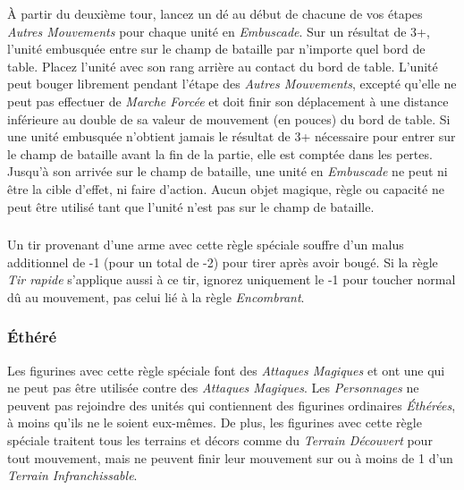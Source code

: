  À partir du deuxième tour, lancez un dé au début de chacune de vos étapes \emph{Autres Mouvements} pour chaque unité en \emph{Embuscade}. Sur un résultat de 3+, l'unité embusquée entre sur le champ de bataille par n'importe quel bord de table. Placez l'unité avec son rang arrière au contact du bord de table. L'unité peut bouger librement pendant l'étape des \emph{Autres Mouvements}, excepté qu'elle ne peut pas effectuer de \emph{Marche Forcée} et doit finir son déplacement à une distance inférieure au double de sa valeur de mouvement (en pouces) du bord de table. Si une unité embusquée n'obtient jamais le résultat de 3+ nécessaire pour entrer sur le champ de bataille avant la fin de la partie, elle est comptée dans les pertes.  Jusqu'à son arrivée sur le champ de bataille, une unité en \emph{Embuscade} ne peut ni être la cible d'effet, ni faire d'action. Aucun objet magique, règle ou capacité ne peut être utilisé tant que l'unité n'est pas sur le champ de bataille.

\subsubsection*{}

Un tir provenant d'une arme avec cette règle spéciale souffre d'un malus additionnel de -1 (pour un total de -2) pour tirer après avoir bougé. Si la règle \emph{Tir rapide} s'applique aussi à ce tir, ignorez uniquement le -1 pour toucher normal dû au mouvement, pas celui lié à la règle \emph{Encombrant}.

\subsubsection*{Éthéré}

Les figurines avec cette règle spéciale font des \emph{Attaques Magiques} et ont une  qui ne peut pas être utilisée contre des \emph{Attaques Magiques}. Les \emph{Personnages} ne peuvent pas rejoindre des unités qui contiennent des figurines ordinaires \emph{Éthérées}, à moins qu'ils ne le soient eux-mêmes. De plus, les figurines avec cette règle spéciale traitent tous les terrains et décors comme du \emph{Terrain Découvert} pour tout mouvement, mais ne peuvent finir leur mouvement sur ou à moins de 1{\pouce} d'un \emph{Terrain Infranchissable}.

